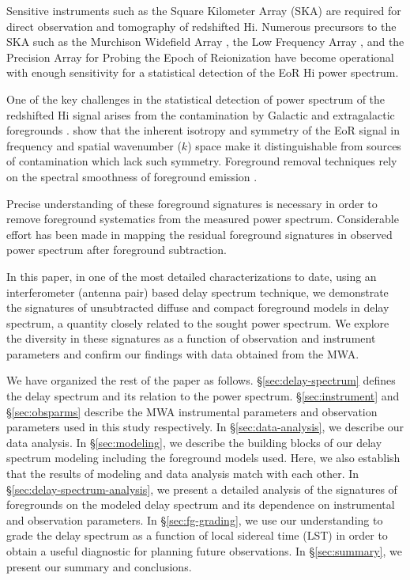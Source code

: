 \documentclass[preprint2,iop,numberedappendix]{emulateapj}
\begin{document}
Sensitive instruments such as the Square Kilometer Array (SKA) are required for direct observation and tomography of redshifted H{\sc i}. Numerous precursors to the SKA such as the Murchison Widefield Array \citep[MWA;][]{lon09,tin13}, the Low Frequency Array \citep[LOFAR;][]{van13}, and the Precision Array for Probing the Epoch of Reionization \citep[PAPER;][]{par10} have become operational with enough sensitivity for a statistical detection of the EoR H{\sc i} power spectrum. 

One of the key challenges in the statistical detection of power spectrum of the redshifted H{\sc i} signal arises from the contamination by Galactic and extragalactic foregrounds \citep[see, e.g.,][]{dim02,zal04,fur06}. \citet{mor04} show that the inherent isotropy and symmetry of the EoR signal in frequency and spatial wavenumber ($k$) space make it distinguishable from sources of contamination which lack such symmetry. Foreground removal techniques rely on the spectral smoothness of foreground emission \citep{mor06,bow09,liu11,par12,dil13}.

Precise understanding of these foreground signatures is necessary in order to remove foreground systematics from the measured power spectrum. Considerable effort has been made in mapping the residual foreground signatures in observed power spectrum \citep{thy13,pob13,mor12,tro12,dat10,bow09} after foreground subtraction. 

In this paper, in one of the most detailed characterizations to date, using an interferometer (antenna pair) based delay spectrum technique, we demonstrate the signatures of unsubtracted diffuse and compact foreground models in delay spectrum, a quantity closely related to the sought power spectrum. We explore the diversity in these signatures as a function of observation and instrument parameters and confirm our findings with data obtained from the MWA.

We have organized the rest of the paper as follows. \S\ref{sec:delay-spectrum} defines the delay spectrum and its relation to the power spectrum. \S\ref{sec:instrument} and \S\ref{sec:obsparms} describe the MWA instrumental parameters and observation parameters used in this study respectively. In \S\ref{sec:data-analysis}, we describe our data analysis. In \S\ref{sec:modeling}, we describe the building blocks of our delay spectrum modeling including the foreground models used. Here, we also establish that the results of modeling and data analysis match with each other. In \S\ref{sec:delay-spectrum-analysis}, we present a detailed analysis of the signatures of foregrounds on the modeled delay spectrum and its dependence on instrumental and observation parameters. In \S\ref{sec:fg-grading}, we use our understanding to grade the delay spectrum as a function of local sidereal time (LST) in order to obtain a useful diagnostic for planning future observations. In \S\ref{sec:summary}, we present our summary and conclusions.
\end{document}
